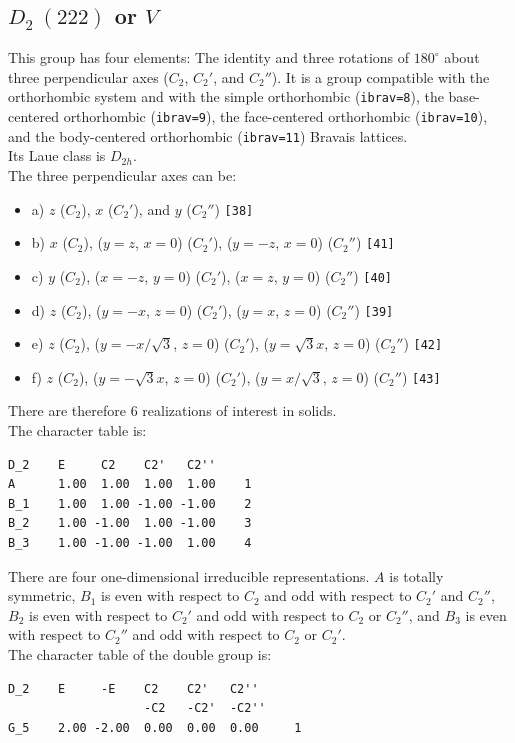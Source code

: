 \documentclass[12pt,a4paper]{article}
\begin{document}
\newpage
\subsection{\color{web-blue}$D_2\ (222)$ or $V$} 
This group has four elements: The identity and three rotations of $180^\circ$ about 
three perpendicular axes ($C_2$, $C_2'$, and $C_2''$). It is a group compatible with 
the orthorhombic system and with the simple orthorhombic (\texttt{ibrav=8}), 
the base-centered orthorhombic (\texttt{ibrav=9}), the face-centered orthorhombic 
(\texttt{ibrav=10}), and the body-centered orthorhombic (\texttt{ibrav=11}) Bravais 
lattices. \\ 
Its Laue class is $D_{2h}$. \\
The three perpendicular axes can be: 
\begin{itemize}
\item
a) $z$ ($C_2$), $x$ ($C_2'$), and $y$ ($C_2''$) \texttt{[38]}
\item
b) $x$ ($C_2$), ($y=z$, $x=0$) ($C_2'$), ($y=-z$, $x=0$) ($C_2''$) \texttt{[41]}
\item
c) $y$ ($C_2$), ($x=-z$, $y=0$) ($C_2'$), ($x=z$, $y=0$) ($C_2''$) \texttt{[40]}
\item
d) $z$ ($C_2$), ($y=-x$, $z=0$) ($C_2'$), ($y=x$, $z=0$) ($C_2''$) \texttt{[39]}
\item
e) $z$ ($C_2$), ($y=-x/\sqrt{3}$, $z=0$) ($C_2'$), ($y=\sqrt{3}x$, $z=0$) ($C_2''$) \texttt{[42]}
\item
f) $z$ ($C_2$), ($y=-\sqrt{3}x$, $z=0$) ($C_2'$), ($y=x/\sqrt{3}$, $z=0$) ($C_2''$) \texttt{[43]}
\end{itemize}
There are therefore $6$ realizations of interest in solids. \\
The character table is:
\begin{verbatim}
D_2    E     C2    C2'   C2''
A      1.00  1.00  1.00  1.00    1
B_1    1.00  1.00 -1.00 -1.00    2
B_2    1.00 -1.00  1.00 -1.00    3
B_3    1.00 -1.00 -1.00  1.00    4
\end{verbatim}
There are four one-dimensional irreducible representations.
$A$ is totally symmetric, $B_1$ is even with respect to
$C_2$ and odd with respect to $C_2'$ and $C_2''$, 
$B_2$ is even with respect to $C_2'$ and odd with respect to $C_2$ or $C_2''$,
and $B_3$ is even with respect to $C_2''$ and odd with respect to
$C_2$ or $C_2'$. \\
The character table of the double group is:
\begin{verbatim}
D_2    E     -E    C2    C2'   C2'' 
                   -C2   -C2'  -C2''
G_5    2.00 -2.00  0.00  0.00  0.00     1
\end{verbatim}
\end{document}
